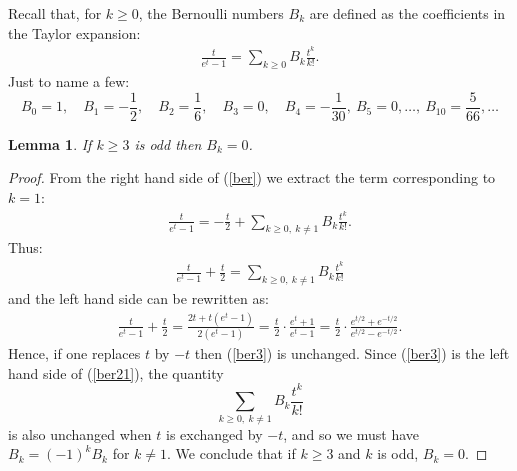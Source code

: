 \documentclass[12pt]{article}
\newtheorem*{lemma}{Lemma}
\theoremstyle{definition}
\begin{document}
Recall that, for $k\geq 0$, the Bernoulli numbers $B_k$ are defined as the coefficients in the Taylor expansion:
\begin{eqnarray}
\label{ber} \frac{t}{e^t-1}=\sum_{k\geq 0} B_k \frac{t^k}{k!}.
\end{eqnarray}
Just to name a few:
$$B_0=1,\quad B_1=-\frac{1}{2},\quad B_2=\frac{1}{6},\quad B_3=0,\quad B_4=-\frac{1}{30},\ B_5=0,\ldots,\ B_{10}=\frac{5}{66},\ldots $$
\begin{lemma}
If $k\geq 3$ is odd then $B_k=0$.
\end{lemma}
\begin{proof}
From the right hand side of (\ref{ber}) we extract the term corresponding to $k=1$:
\begin{eqnarray}
\label{ber2} \frac{t}{e^t-1}=-\frac{t}{2}+\sum_{k\geq 0,\ k\neq 1} B_k \frac{t^k}{k!}.
\end{eqnarray}
Thus:
\begin{eqnarray}
\label{ber21} \frac{t}{e^t-1}+\frac{t}{2}=\sum_{k\geq 0,\ k\neq 1} B_k \frac{t^k}{k!}
\end{eqnarray}
and the left hand side can be rewritten as:
\begin{eqnarray}
\label{ber3} \frac{t}{e^t-1}+\frac{t}{2}= \frac{2t+t(e^t-1)}{2(e^t-1)} =
\frac{t}{2}\cdot \frac{e^t+1}{e^t-1}=\frac{t}{2} \cdot \frac{e^{t/2}+e^{-t/2}}{e^{t/2}-e^{-t/2}}.
\end{eqnarray}
Hence, if one replaces $t$ by $-t$ then (\ref{ber3}) is unchanged. Since (\ref{ber3}) is the left hand side of (\ref{ber21}), the quantity 
$$\sum_{k\geq 0,\ k\neq 1} B_k \frac{t^k}{k!}$$
is also unchanged when $t$ is exchanged by $-t$, and so we must have $B_k=(-1)^kB_k$ for $k\neq 1$. We conclude that if $k\geq 3$ and $k$ is odd, $B_k=0$.
\end{proof}
\end{document}
